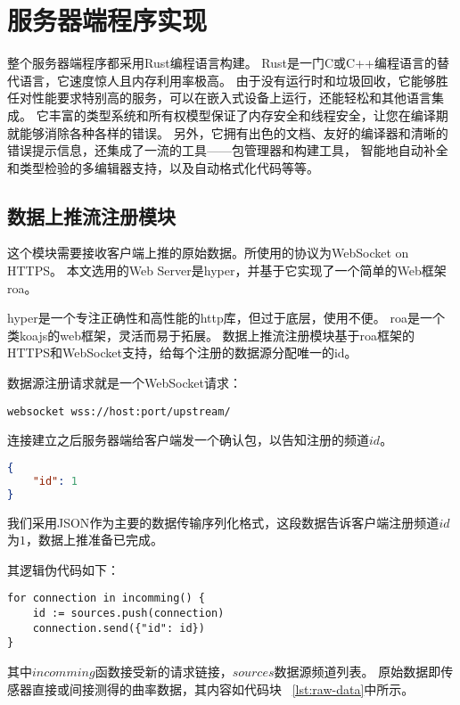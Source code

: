 \cleardoublepage

\section{服务器端程序实现}

整个服务器端程序都采用Rust编程语言\cite{rust}构建。
Rust是一门C或C++编程语言的替代语言，它速度惊人且内存利用率极高。
由于没有运行时和垃圾回收，它能够胜任对性能要求特别高的服务，可以在嵌入式设备上运行，还能轻松和其他语言集成。
它丰富的类型系统和所有权模型保证了内存安全和线程安全，让您在编译期就能够消除各种各样的错误。
另外，它拥有出色的文档、友好的编译器和清晰的错误提示信息，还集成了一流的工具——包管理器和构建工具，
智能地自动补全和类型检验的多编辑器支持，以及自动格式化代码等等。 

\subsection{数据上推流注册模块}
这个模块需要接收客户端上推的原始数据。所使用的协议为WebSocket on HTTPS。
本文选用的Web Server是hyper\cite{hyper}，并基于它实现了一个简单的Web框架roa\cite{roa}。

hyper是一个专注正确性和高性能的http库，但过于底层，使用不便。
roa是一个类koajs\cite{koajs}的web框架，灵活而易于拓展。
数据上推流注册模块基于roa框架的HTTPS和WebSocket支持，给每个注册的数据源分配唯一的id。

数据源注册请求就是一个WebSocket请求：

\begin{lstlisting}[caption={发起数据源注册请求}]
websocket wss://host:port/upstream/
\end{lstlisting}

连接建立之后服务器端给客户端发一个确认包，以告知注册的频道$id$。

\begin{lstlisting}[language=json,firstnumber=1,caption={数据源注册成功}]
{
    "id": 1
}
\end{lstlisting}

我们采用JSON\cite{rfc7159}作为主要的数据传输序列化格式，这段数据告诉客户端注册频道$id$为$1$，数据上推准备已完成。

其逻辑伪代码如下：

\begin{lstlisting}[caption={注册数据源}]
for connection in incomming() {
    id := sources.push(connection)
    connection.send({"id": id})
}
\end{lstlisting}

其中$incomming$函数接受新的请求链接，$sources$数据源频道列表。
原始数据即传感器直接或间接测得的曲率数据，其内容如代码块 ~\ref{lst:raw-data}中所示。

